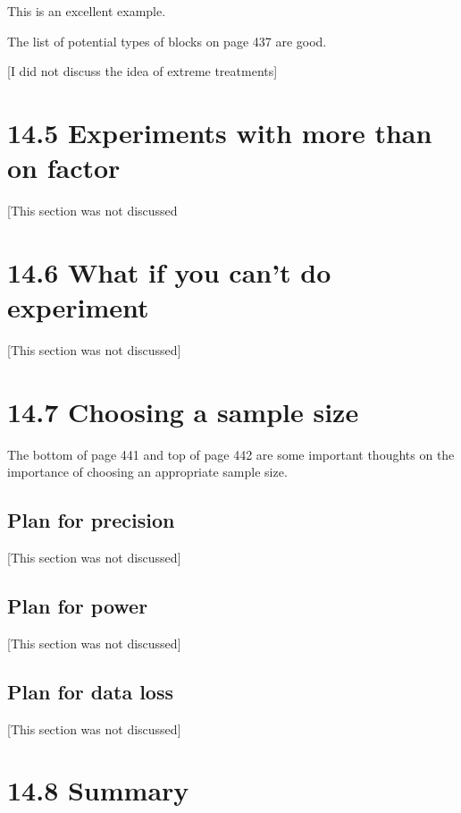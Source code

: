 \documentclass[]{book}
\theoremstyle{definition}
\theoremstyle{definition}
\theoremstyle{definition}
\theoremstyle{remark}
\begin{document}
This is an excellent example.

The list of potential types of blocks on page 437 are good.

{[}I did not discuss the idea of extreme treatments{]}

\section{14.5 Experiments with more than on
factor}\label{experiments-with-more-than-on-factor}

{[}This section was not discussed

\section{14.6 What if you can't do
experiment}\label{what-if-you-cant-do-experiment}

{[}This section was not discussed{]}

\section{14.7 Choosing a sample size}\label{choosing-a-sample-size}

The bottom of page 441 and top of page 442 are some important thoughts
on the importance of choosing an appropriate sample size.

\subsection{Plan for precision}\label{plan-for-precision}

{[}This section was not discussed{]}

\subsection{Plan for power}\label{plan-for-power}

{[}This section was not discussed{]}

\subsection{Plan for data loss}\label{plan-for-data-loss}

{[}This section was not discussed{]}

\section{14.8 Summary}\label{summary-5}
\end{document}

